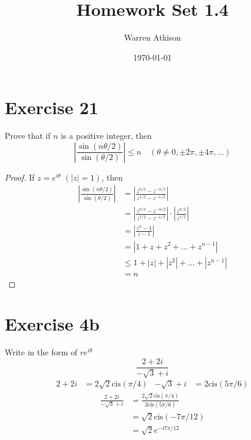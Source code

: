 \documentclass{article}
\title{Homework Set 1.4}
\author{Warren Atkison}
\date{\today}
\begin{document}
\maketitle

\section*{Exercise 21}
Prove that if $n$ is a positive integer, then
\[
	\left|\frac{\sin(n\theta/2)}{\sin(\theta/2)}\right| \leq n \quad (\theta \neq 0, \pm 2\pi, \pm 4\pi, \ldots)
\]
\begin{proof}	
	If $z = e^{i\theta}$ $(|z| = 1)$, then
	\begin{align*}
		\left|\frac{\sin(n\theta/2)}{\sin(\theta/2)}\right| &= \left|\frac{z^{n/2} - z^{-n/2}}{z^{1/2} - z^{-1/2}}\right| \\
								    &= \left|\frac{z^{n/2} - z^{-n/2}}{z^{1/2} - z^{-1/2}}\right| \cdot \left|\frac{z^{n/2}}{z^{1/2}}\right| \\
								    &= \left|\frac{z^n - 1}{z - 1}\right| \\
								    &= |1 + z + z^2 + \ldots + z^{n-1}| \\ 
								    &\leq 1 + |z| + |z^2| + \ldots + |z^{n-1}| \\
								    &= n
	\end{align*}
\end{proof}
\newpage
\section*{Exercise 4b}
Write in the form of $re^{i\theta}$
\[
	\frac{2 + 2i}{-\sqrt{3} + i}
\]
\begin{align*}
	2 + 2i &= 2\sqrt{2}\text{cis}(\pi/4) & -\sqrt{3} + i &= 2\text{cis}(5\pi/6)  
\end{align*}
\begin{align*}
	\frac{2 + 2i}{-\sqrt{3} + i} &= \frac{2\sqrt{2}\text{cis}(\pi/4)}{2\text{cis}(5\pi/6)} \\
				     &= \sqrt{2}\text{cis}(-7\pi/12) \\
				     &= \sqrt{2} e^{-i7\pi/12}
\end{align*}
\end{document}
